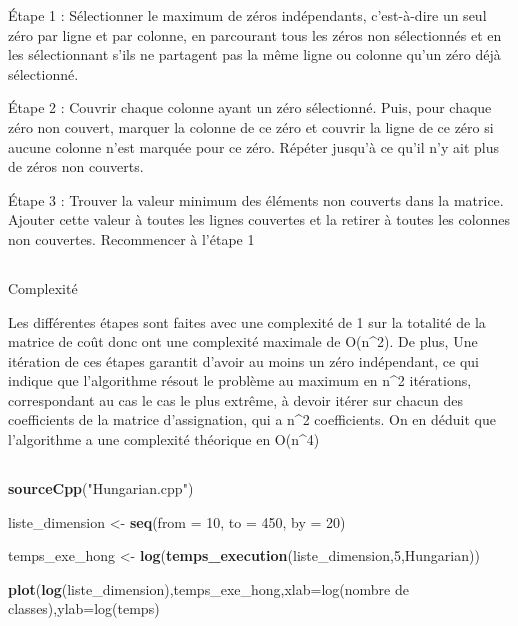 \documentclass[
]{article}
\newenvironment{Shaded}{\begin{snugshade}}{\end{snugshade}}
\newcommand{\AttributeTok}[1]{\textcolor[rgb]{0.13,0.29,0.53}{#1}}
\newcommand{\DecValTok}[1]{\textcolor[rgb]{0.00,0.00,0.81}{#1}}
\newcommand{\FunctionTok}[1]{\textcolor[rgb]{0.13,0.29,0.53}{\textbf{#1}}}
\newcommand{\NormalTok}[1]{#1}
\newcommand{\OtherTok}[1]{\textcolor[rgb]{0.56,0.35,0.01}{#1}}
\newcommand{\StringTok}[1]{\textcolor[rgb]{0.31,0.60,0.02}{#1}}
\begin{document}
Étape 1 : Sélectionner le maximum de zéros indépendants, c'est-à-dire un
seul zéro par ligne et par colonne, en parcourant tous les zéros non
sélectionnés et en les sélectionnant s'ils ne partagent pas la même
ligne ou colonne qu'un zéro déjà sélectionné.

Étape 2 : Couvrir chaque colonne ayant un zéro sélectionné. Puis, pour
chaque zéro non couvert, marquer la colonne de ce zéro et couvrir la
ligne de ce zéro si aucune colonne n'est marquée pour ce zéro. Répéter
jusqu'à ce qu'il n'y ait plus de zéros non couverts.

Étape 3 : Trouver la valeur minimum des éléments non couverts dans la
matrice. Ajouter cette valeur à toutes les lignes couvertes et la
retirer à toutes les colonnes non couvertes. Recommencer à l'étape 1

\hypertarget{section-14}{%
\subsection{}\label{section-14}}

Complexité

Les différentes étapes sont faites avec une complexité de 1 sur la
totalité de la matrice de coût donc ont une complexité maximale de
O(n\^{}2). De plus, Une itération de ces étapes garantit d'avoir au
moins un zéro indépendant, ce qui indique que l'algorithme résout le
problème au maximum en n\^{}2 itérations, correspondant au cas le cas le
plus extrême, à devoir itérer sur chacun des coefficients de la matrice
d'assignation, qui a n\^{}2 coefficients. On en déduit que l'algorithme
a une complexité théorique en O(n\^{}4)

\hypertarget{section-15}{%
\subsection{}\label{section-15}}

\begin{Shaded}
\begin{Highlighting}[]
\FunctionTok{sourceCpp}\NormalTok{(}\StringTok{"Hungarian.cpp"}\NormalTok{)}
\end{Highlighting}
\end{Shaded}

\begin{Shaded}
\begin{Highlighting}[]
\NormalTok{liste\_dimension }\OtherTok{\textless{}{-}} \FunctionTok{seq}\NormalTok{(}\AttributeTok{from =} \DecValTok{10}\NormalTok{, }\AttributeTok{to =} \DecValTok{450}\NormalTok{, }\AttributeTok{by =} \DecValTok{20}\NormalTok{)}

\NormalTok{temps\_exe\_hong }\OtherTok{\textless{}{-}} \FunctionTok{log}\NormalTok{(}\FunctionTok{temps\_execution}\NormalTok{(liste\_dimension,}\DecValTok{5}\NormalTok{,Hungarian))}

\FunctionTok{plot}\NormalTok{(}\FunctionTok{log}\NormalTok{(liste\_dimension),temps\_exe\_hong,}\AttributeTok{xlab=}\StringTok{\textquotesingle{}log(nombre de classes)\textquotesingle{}}\NormalTok{,}\AttributeTok{ylab=}\StringTok{\textquotesingle{}log(temps\textquotesingle{}}\NormalTok{)}
\end{Highlighting}
\end{Shaded}
\end{document}
